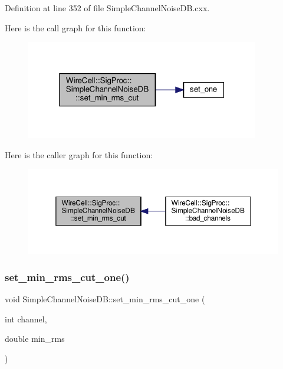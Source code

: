 Definition at line 352 of file Simple\+Channel\+Noise\+D\+B.\+cxx.

Here is the call graph for this function\+:
\nopagebreak
\begin{figure}[H]
\begin{center}
\leavevmode
\includegraphics[width=289pt]{class_wire_cell_1_1_sig_proc_1_1_simple_channel_noise_d_b_a5113500df9dcd76defe1493534c4c9bc_cgraph}
\end{center}
\end{figure}
Here is the caller graph for this function\+:
\nopagebreak
\begin{figure}[H]
\begin{center}
\leavevmode
\includegraphics[width=350pt]{class_wire_cell_1_1_sig_proc_1_1_simple_channel_noise_d_b_a5113500df9dcd76defe1493534c4c9bc_icgraph}
\end{center}
\end{figure}
\mbox{\label{class_wire_cell_1_1_sig_proc_1_1_simple_channel_noise_d_b_a110d73be2690691e60d916bf8cbb4ea9}} 
\subsubsection{\texorpdfstring{set\+\_\+min\+\_\+rms\+\_\+cut\+\_\+one()}{set\_min\_rms\_cut\_one()}}
{\footnotesize\ttfamily void Simple\+Channel\+Noise\+D\+B\+::set\+\_\+min\+\_\+rms\+\_\+cut\+\_\+one (\begin{DoxyParamCaption}\item[{int}]{channel,  }\item[{double}]{min\+\_\+rms }\end{DoxyParamCaption})}



